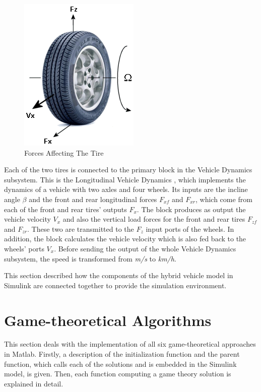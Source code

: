 \begin{figure}[h]
\centering
\includegraphics[scale=0.5]{figures/tire}
\caption{Forces Affecting The Tire \citep{tireMatlab}}
\label{fig:tire}
\end{figure}

Each of the two tires is connected to the primary block in the Vehicle Dynamics subsystem. This is the Longitudinal Vehicle Dynamics \citep{vehicleDynMatlab}, which implements the dynamics of a vehicle with two axles and four wheels. Its inputs are the incline angle $\beta$ and the front and rear longitudinal forces $F_{xf}$ and $F_{xr}$, which come from each of the front and rear tires' outputs $F_x$. The block produces as output the vehicle velocity $V_x$ and also the vertical load forces for the front and rear tires $F_{zf}$ and $F_{zr}$. These two are transmitted to the $F_z$ input ports of the wheels. In addition, the block calculates the vehicle velocity which is also fed back to the wheels' ports $V_x$. Before sending the output of the whole Vehicle Dynamics subsystem, the speed is transformed from \textit{m/s} to \textit{km/h}.

This section described how the components of the hybrid vehicle model in Simulink are connected together to provide the simulation environment. 

\section{Game-theoretical Algorithms}
This section deals with the implementation of all six game-theoretical approaches in Matlab. Firstly, a description of the initialization function and the parent function, which calls each of the solutions and is embedded in the Simulink model, is given. Then, each function computing a game theory solution is explained in detail.

